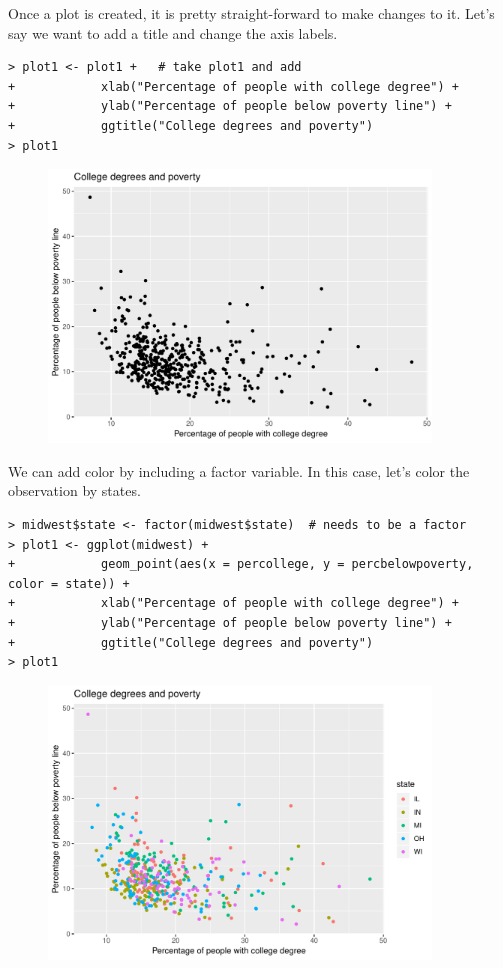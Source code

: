 Once a plot is created, it is pretty straight-forward to make changes to it. Let's say we want to add a title and change the axis labels.

\begin{lstlisting}
> plot1 <- plot1 +   # take plot1 and add
+            xlab("Percentage of people with college degree") +
+            ylab("Percentage of people below poverty line") +
+            ggtitle("College degrees and poverty")
> plot1
\end{lstlisting}

\begin{figure}[h]
\centering
\includegraphics[width=4in]{plots/04.pdf} 
\end{figure}

We can add color by including a factor variable. In this case, let's color the observation by states.

\begin{lstlisting}
> midwest$state <- factor(midwest$state)  # needs to be a factor
> plot1 <- ggplot(midwest) +
+            geom_point(aes(x = percollege, y = percbelowpoverty, color = state)) +
+            xlab("Percentage of people with college degree") +
+            ylab("Percentage of people below poverty line") +
+            ggtitle("College degrees and poverty")
> plot1
\end{lstlisting}

\begin{figure}[h]
\centering
\includegraphics[width=4in]{plots/05.pdf} 
\end{figure}

